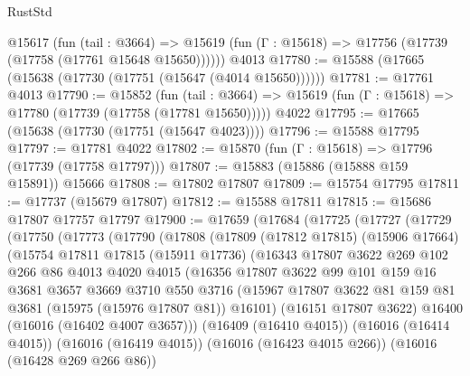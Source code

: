 \begin{lexlean}{RustStd}
\begin{coremodule}
    @15617
      (fun (tail : @3664) =>
      @15619 (fun (Γ : @15618) => @17756 (@17739 (@17758 (@17761 @15648 @15650))))))
    @4013
@17780 := @15588 (@17665 (@15638 (@17730 (@17751 (@15647 (@4014 @15650))))))
@17781 := @17761 @4013
@17790 := @15852
    (fun (tail : @3664) => @15619 (fun (Γ : @15618) => @17780 (@17739 (@17758 (@17781 @15650)))))
    @4022
@17795 := @17665 (@15638 (@17730 (@17751 (@15647 @4023))))
@17796 := @15588 @17795
@17797 := @17781 @4022
@17802 := @15870 (fun (Γ : @15618) => @17796 (@17739 (@17758 @17797)))
@17807 := @15883 (@15886 (@15888 @159 @15891)) @15666
@17808 := @17802 @17807
@17809 := @15754 @17795
@17811 := @17737 (@15679 @17807)
@17812 := @15588 @17811
@17815 := @15686 @17807 @17757 @17797
@17900 := @17659
    (@17684
      (@17725
        (@17727
          (@17729
            (@17750
              (@17773
                (@17790
                  (@17808
                    (@17809
                      (@17812 @17815)
                      (@15906 @17664)
                      (@15754
                        @17811
                        @17815
                        (@15911 @17736)
                        (@16343
                          @17807
                          @3622
                          @269
                          @102
                          @266
                          @86
                          @4013
                          @4020
                          @4015
                          (@16356
                            @17807
                            @3622
                            @99
                            @101
                            @159
                            @16
                            @3681
                            @3657
                            @3669
                            @3710
                            @550
                            @3716
                            (@15967
                              @17807
                              @3622
                              @81
                              @159
                              @81
                              @3681
                              (@15975 (@15976 @17807 @81))
                              @16101)
                            (@16151 @17807 @3622)
                            @16400
                            (@16016 (@16402 @4007 @3657)))
                          (@16409 (@16410 @4015))
                          (@16016 (@16414 @4015))
                          (@16016 (@16419 @4015))
                          (@16016 (@16423 @4015 @266))
                          (@16016 (@16428 @269 @266 @86))

\end{coremodule}
\end{lexlean}
